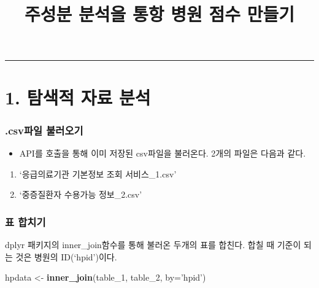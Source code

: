 \documentclass[
]{article}
\title{주성분 분석을 통항 병원 점수 만들기}
\author{}
\date{\vspace{-2.5em}}
\newenvironment{Shaded}{\begin{snugshade}}{\end{snugshade}}
\newcommand{\DataTypeTok}[1]{\textcolor[rgb]{0.13,0.29,0.53}{#1}}
\newcommand{\DecValTok}[1]{\textcolor[rgb]{0.00,0.00,0.81}{#1}}
\newcommand{\KeywordTok}[1]{\textcolor[rgb]{0.13,0.29,0.53}{\textbf{#1}}}
\newcommand{\NormalTok}[1]{#1}
\newcommand{\StringTok}[1]{\textcolor[rgb]{0.31,0.60,0.02}{#1}}
\providecommand{\tightlist}{%
  \setlength{\itemsep}{0pt}\setlength{\parskip}{0pt}}
\begin{document}
\maketitle

\begin{center}\rule{0.5\linewidth}{0.5pt}\end{center}

\hypertarget{uxd0d0uxc0c9uxc801-uxc790uxb8cc-uxbd84uxc11d}{%
\section{1. 탐색적 자료
분석}\label{uxd0d0uxc0c9uxc801-uxc790uxb8cc-uxbd84uxc11d}}

\hypertarget{csvuxd30cuxc77c-uxbd88uxb7ecuxc624uxae30}{%
\subsubsection{.csv파일
불러오기}\label{csvuxd30cuxc77c-uxbd88uxb7ecuxc624uxae30}}

\begin{itemize}
\tightlist
\item
  API를 호출을 통해 이미 저장된 csv파일을 불러온다. 2개의 파일은 다음과
  같다.
\end{itemize}

\begin{enumerate}
\def\labelenumi{\arabic{enumi}.}
\tightlist
\item
  `응급의료기관 기본정보 조회 서비스\_1.csv'
\item
  `중증질환자 수용가능 정보\_2.csv'
\end{enumerate}

\hypertarget{uxd45c-uxd569uxce58uxae30}{%
\subsubsection{표 합치기}\label{uxd45c-uxd569uxce58uxae30}}

dplyr 패키지의 inner\_join함수를 통해 불러온 두개의 표를 합친다. 합칠 때
기준이 되는 것은 병원의 ID(`hpid')이다.

\begin{Shaded}
\begin{Highlighting}[]
\NormalTok{hpdata <-}\StringTok{ }\KeywordTok{inner_join}\NormalTok{(table_}\DecValTok{1}\NormalTok{, table_}\DecValTok{2}\NormalTok{, }\DataTypeTok{by=}\StringTok{'hpid'}\NormalTok{)}
\end{Highlighting}
\end{Shaded}
\end{document}

